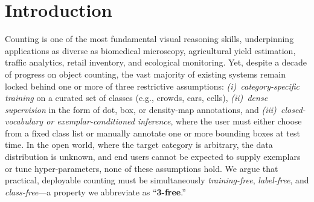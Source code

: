\documentclass[letterpaper]{article}
\begin{document}

\section{Introduction}
\label{sec:intro}

Counting is one of the most fundamental visual reasoning skills, underpinning applications as diverse as biomedical microscopy, agricultural yield estimation, traffic analytics, retail inventory, and ecological monitoring. Yet, despite a decade of progress on object counting, the vast majority of existing systems remain locked behind one or more of three restrictive assumptions: \emph{(i)~category-specific training} on a curated set of classes (e.g., crowds, cars, cells), \emph{(ii)~dense supervision} in the form of dot, box, or density-map annotations, and \emph{(iii)~closed-vocabulary or exemplar-conditioned inference}, where the user must either choose from a fixed class list or manually annotate one or more bounding boxes at test time. In the open world, where the target category is arbitrary, the data distribution is unknown, and end users cannot be expected to supply exemplars or tune hyper-parameters, none of these assumptions hold. We argue that practical, deployable counting must be simultaneously \emph{training-free}, \emph{label-free}, and \emph{class-free}---a property we abbreviate as ``\textbf{3-free}.''
\end{document}
